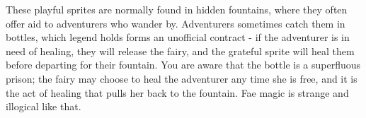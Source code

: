 \documentclass[blue]{Katmeers}
\begin{document}
\name{\bFairies{}}

These playful sprites are normally found in hidden fountains, where they often offer aid to adventurers who wander by.  Adventurers sometimes catch them in bottles, which legend holds forms an unofficial contract - if the adventurer is in need of healing, they will release the fairy, and the grateful sprite will heal them before departing for their fountain.  You are aware that the bottle is a superfluous prison; the fairy may choose to heal the adventurer any time she is free, and it is the act of healing that pulls her back to the fountain.  Fae magic is strange and illogical like that.
\end{document}
